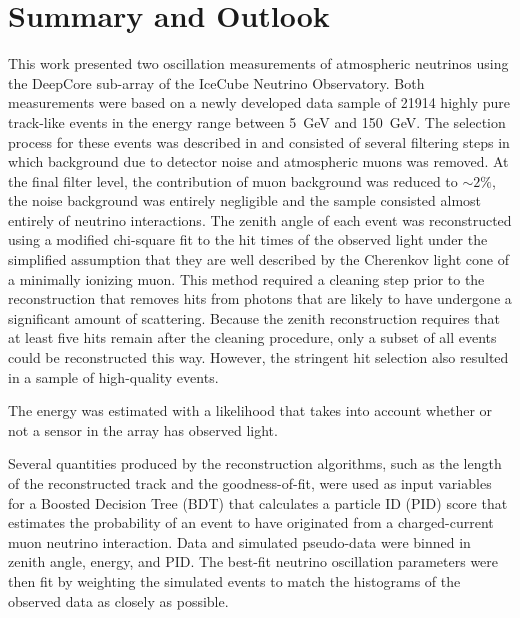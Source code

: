 \setchapterpreamble[u]{\margintoc}
\chapter{Summary and Outlook}

\label{sec:summary}

This work presented two oscillation measurements of atmospheric neutrinos using the DeepCore sub-array of the IceCube Neutrino Observatory.
Both measurements were based on a newly developed data sample of \num{21914} highly pure track-like events in the energy range between \SI{5}{\giga\electronvolt} and \SI{150}{\giga\electronvolt}.
The selection process for these events was described in  and consisted of several filtering steps in which background due to detector noise and atmospheric muons was removed.
At the final filter level, the contribution of muon background was reduced to $\sim2\%$, the noise background was entirely negligible and the sample consisted almost entirely of neutrino interactions.
The zenith angle of each event was reconstructed using a modified chi-square fit to the hit times of the observed light under the simplified assumption that they are well described by the Cherenkov light cone of a minimally ionizing muon.
This method required a cleaning step prior to the reconstruction that removes hits from photons that are likely to have undergone a significant amount of scattering.
Because the zenith reconstruction requires that at least five hits remain after the cleaning procedure, only a subset of all events could be reconstructed this way.
However, the stringent hit selection also resulted in a sample of high-quality events.

The energy was estimated with a likelihood that takes into account whether or not a sensor in the array has observed light.

Several quantities produced by the reconstruction algorithms, such as the length of the reconstructed track and the goodness-of-fit, were used as input variables for a Boosted Decision Tree (BDT) that calculates a particle ID (PID) score that estimates the probability of an event to have originated from a charged-current muon neutrino interaction.
Data and simulated pseudo-data were binned in zenith angle, energy, and PID.
The best-fit neutrino oscillation parameters were then fit by weighting the simulated events to match the histograms of the observed data as closely as possible.


